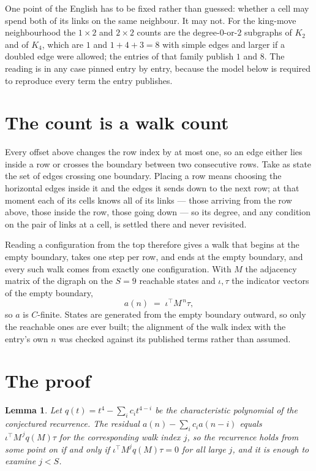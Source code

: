 \documentclass[11pt,a4paper]{article}
\theoremstyle{plain}
\newtheorem{lemma}[theorem]{Lemma}
\theoremstyle{definition}
\begin{document}
One point of the English has to be fixed rather than guessed: whether a cell may spend both of
its links on the same neighbour. It may not. For the king-move neighbourhood the $1\times2$
and $2\times2$ counts are the degree-$0$-or-$2$ subgraphs of $K_2$ and of $K_4$, which are $1$
and $1+4+3=8$ with simple edges and larger if a doubled edge were allowed; the entries of that
family publish $1$ and $8$. The reading is in any case pinned entry by entry, because the
model below is required to reproduce every term the entry publishes.


\section{The count is a walk count}

Every offset above changes the row index by at most one, so an edge either lies inside a row
or crosses the boundary between two consecutive rows. Take as state the set of edges crossing
one boundary. Placing a row means choosing the horizontal edges inside it and the edges it
sends down to the next row; at that moment each of its cells knows all of its links --- those
arriving from the row above, those inside the row, those going down --- so its degree, and any
condition on the pair of links at a cell, is settled there and never revisited.

Reading a configuration from the top therefore gives a walk that begins at the empty boundary,
takes one step per row, and ends at the empty boundary, and every such walk comes from exactly
one configuration. With $M$ the adjacency matrix of the digraph on the $S=9$ reachable
states and $\iota,\tau$ the indicator vectors of the empty boundary,
\[
a(n)\;=\;\iota^{\!\top}M^{\,n}\tau ,
\]
so $a$ is $C$-finite. States are generated from the empty boundary outward, so only the
reachable ones are ever built; the alignment of the walk index with the entry's own $n$ was
checked against its published terms rather than assumed.

\section{The proof}

\begin{lemma}\label{lem:crit}
Let $q(t)=t^{4}-\sum_i c_it^{4-i}$ be the characteristic polynomial of the
conjectured recurrence. The residual $a(n)-\sum_ic_ia(n-i)$ equals
$\iota^{\!\top}M^{\,j}q(M)\tau$ for the corresponding walk index $j$, so the recurrence
holds from some point on if and only if $\iota^{\!\top}M^{j}q(M)\tau=0$ for all large $j$,
and it is enough to examine $j<S$.
\end{lemma}
\end{document}
